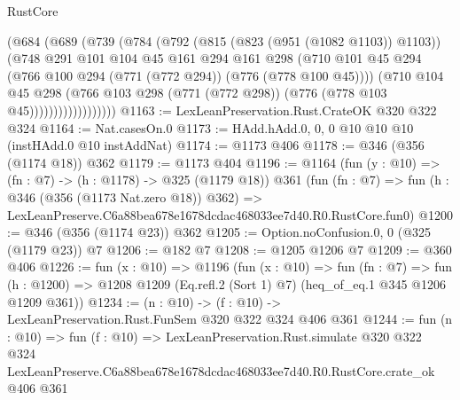 \begin{lexlean}{RustCore}
\begin{coremodule}
                    (@684
                      (@689
                        (@739
                          (@784
                            (@792
                              (@815 (@823 (@951 (@1082 @1103)) @1103))
                              (@748
                                @291
                                @101
                                @104
                                @45
                                @161
                                @294
                                @161
                                @298
                                (@710
                                  @101
                                  @45
                                  @294
                                  (@766 @100 @294 (@771 (@772 @294)) (@776 (@778 @100 @45))))
                                (@710
                                  @104
                                  @45
                                  @298
                                  (@766
                                    @103
                                    @298
                                    (@771 (@772 @298))
                                    (@776 (@778 @103 @45))))))))))))))))))
@1163 := LexLeanPreservation.Rust.CrateOK @320 @322 @324
@1164 := Nat.casesOn.{0}
@1173 := HAdd.hAdd.{0, 0, 0} @10 @10 @10 (instHAdd.{0} @10 instAddNat)
@1174 := @1173 @406
@1178 := @346 (@356 (@1174 @18)) @362
@1179 := @1173 @404
@1196 := @1164
    (fun (y : @10) => (fn : @7) -> (h : @1178) -> @325 (@1179 @18))
    @361
    (fun (fn : @7) =>
    fun (h : @346 (@356 (@1173 Nat.zero @18)) @362) =>
    LexLeanPreserve.C6a88bea678e1678dcdac468033ee7d40.R0.RustCore.fun0)
@1200 := @346 (@356 (@1174 @23)) @362
@1205 := Option.noConfusion.{0, 0} (@325 (@1179 @23)) @7
@1206 := @182 @7
@1208 := @1205 @1206 @7
@1209 := @360 @406
@1226 := fun (x : @10) =>
  @1196
    (fun (x : @10) =>
    fun (fn : @7) =>
    fun (h : @1200) => @1208 @1209 (Eq.refl.{2} (Sort 1) @7) (heq_of_eq.{1} @345 @1206 @1209 @361))
@1234 := (n : @10) -> (f : @10) -> LexLeanPreservation.Rust.FunSem @320 @322 @324 @406 @361
@1244 := fun (n : @10) =>
  fun (f : @10) =>
  LexLeanPreservation.Rust.simulate
    @320
    @322
    @324
    LexLeanPreserve.C6a88bea678e1678dcdac468033ee7d40.R0.RustCore.crate_ok
    @406
    @361
\end{coremodule}
\end{lexlean}
